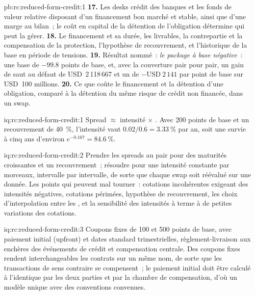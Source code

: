 \begin{solution}{pb:rc:reduced-form-credit:1}
\textbf{17.} Les desks crédit des banques et les fonds de valeur relative disposant d'un financement
bon marché et stable, ainsi que d'une marge au bilan~; le coût en capital de la détention de l'obligation détermine qui peut la gérer.
\textbf{18.} Le financement et sa durée, les livrables, la contrepartie et la compensation de la
protection, l'hypothèse de recouvrement, et l'historique de la base en période de tensions.
\textbf{19.} Résultat nommé~: \emph{le package à base négative}~: une base de $-99.8$ points de base,
et, avec la couverture pair pour pair, un gain de saut au défaut de USD~2\,118\,667 et un  de
$-\text{USD}~2\,141$ par point de base sur USD~100 millions.
\textbf{20.} Ce que coûte le financement et la détention d'une obligation, comparé à la détention du même
risque de crédit non financée, dans un swap.
\end{solution}

\begin{solution}{iq:rc:reduced-form-credit:1}
Spread $\approx$ intensité $\times$ . Avec 200 points de base et un recouvrement de 40~\%,
l'intensité vaut $0.02/0.6 = 3.33~\%$ par an, soit une survie à cinq ans d'environ $e^{-0.167} = 84.6~\%$.
\end{solution}

\begin{solution}{iq:rc:reduced-form-credit:2}
Prendre les spreads au pair pour des maturités croissantes et un recouvrement~; résoudre pour une
intensité constante par morceaux, intervalle par intervalle, de sorte que chaque swap soit réévalué sur une  donnée. Les points qui
peuvent mal tourner~: cotations incohérentes exigeant des intensités négatives, cotations périmées, hypothèse de recouvrement,
les choix d'interpolation entre les , et la sensibilité des intensités à terme
à de petites variations des cotations.
\end{solution}

\begin{solution}{iq:rc:reduced-form-credit:3}
Coupons fixes de 100 et 500 points de base, avec paiement initial (upfront) et dates standard trimestrielles,
règlement-livraison aux enchères des événements de crédit et compensation centrale. Des coupons fixes rendent
interchangeables les contrats sur un même nom, de sorte que les transactions de sens contraire se compensent~; le paiement initial
doit être calculé à l'identique par les deux parties et par la chambre de compensation, d'où un modèle unique avec des conventions convenues.
\end{solution}

